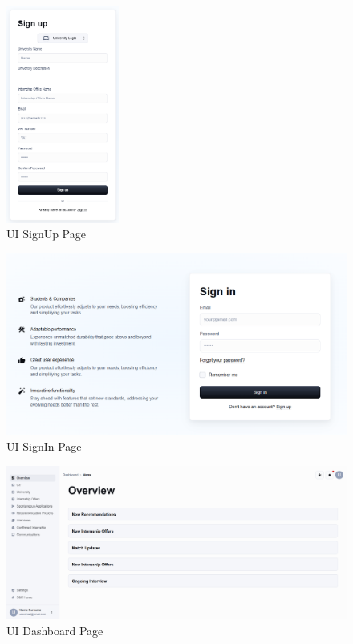 \begin{figure}[H]
    \includegraphics[width=0.33\textwidth]{Latex/Images/UniversitySignUp.png}
    \caption{UI SignUp Page}
    \label{fig:signuppage}
\end{figure}
\begin{figure}[H]
    \centering
    \includegraphics[width=\textwidth]{Latex/Images/SignInPage.png}
    \caption{UI SignIn Page}
    \label{fig:signinpage}
\end{figure}
\begin{figure}[H]
    \centering
    \includegraphics[width=\textwidth]{Latex/Images/Dashboard.png}
    \caption{UI Dashboard Page}
    \label{fig:dashboardpage}
\end{figure}
